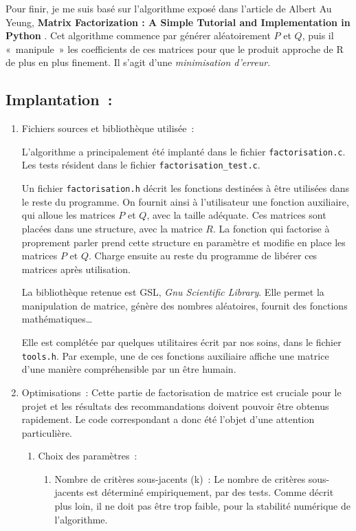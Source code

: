 \documentclass{article}
\begin{document}
Pour finir, je me suis basé sur l’algorithme exposé dans l’article de Albert Au Yeung, \textbf{Matrix Factorization : A Simple Tutorial and Implementation in Python} \cite{ref13}.
Cet algorithme commence par générer aléatoirement $P$ et $Q$, puis il « manipule »
les coefficients de ces matrices pour que le produit approche de R de plus en
plus finement. Il s’agit d’une \emph{minimisation d’erreur}.

\subsection{Implantation :}
\label{sec:orgc4e9e35}
\begin{enumerate}
\item Fichiers sources et bibliothèque utilisée :
\label{sec:org92d7f0a}

L’algorithme a principalement été implanté dans le fichier \texttt{factorisation.c}.
Les tests résident dans le fichier \texttt{factorisation\_test.c}.

Un fichier \texttt{factorisation.h} décrit les fonctions destinées à être utilisées
dans le reste du programme. On fournit ainsi à l’utilisateur une fonction
auxiliaire, qui alloue les matrices $P$ et $Q$, avec la taille adéquate. Ces
matrices sont placées dans une structure, avec la matrice $R$. La fonction qui
factorise à proprement parler prend cette structure en paramètre et modifie en
place les matrices $P$ et $Q$. Charge ensuite au reste du programme de libérer ces
matrices après utilisation.

La bibliothèque retenue est GSL, \emph{Gnu Scientific Library}. Elle permet la
manipulation de matrice, génère des nombres aléatoires, fournit des fonctions
mathématiques…

Elle est complétée par quelques utilitaires écrit par nos soins, dans le fichier
\texttt{tools.h}. Par exemple, une de ces fonctions auxiliaire affiche une matrice
d’une manière compréhensible par un être humain.

\item Optimisations :
\label{sec:org0bdbaff}
Cette partie de factorisation de matrice est cruciale pour le projet et les
résultats des recommandations doivent pouvoir être obtenus rapidement. Le code
correspondant a donc été l’objet d’une attention particulière.
\begin{enumerate}
\item Choix des paramètres :
\label{sec:org401be5e}
\begin{enumerate}
\item Nombre de critères sous-jacents (k) :
\label{sec:orgc72a232}
Le nombre de critères sous-jacents est déterminé empiriquement, par des tests.
Comme décrit plus loin, il ne doit pas être trop faible, pour la stabilité
numérique de l’algorithme.


\end{enumerate}
\end{enumerate}
\end{enumerate}
\end{document}
